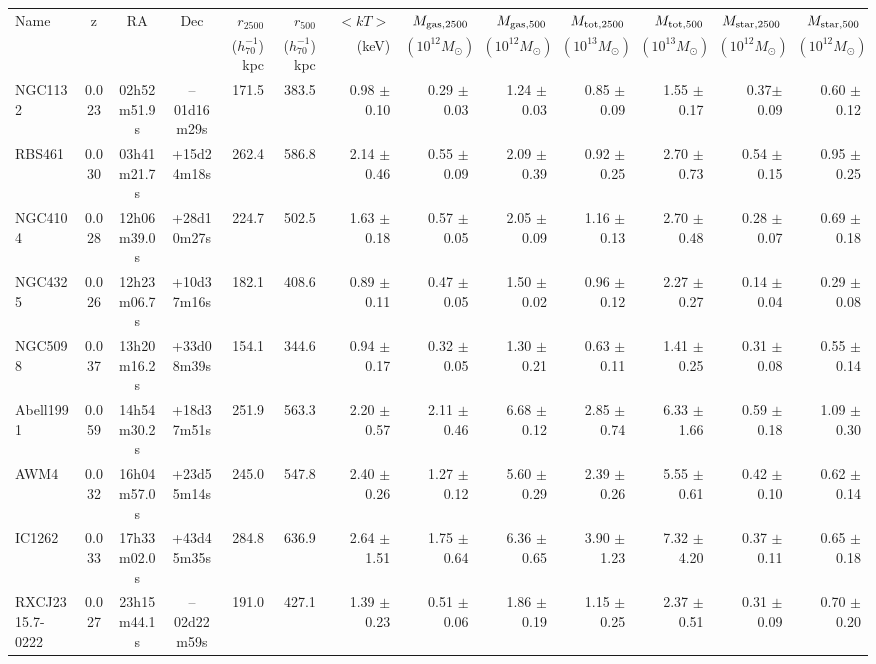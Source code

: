 \begin{tabular}{lcccrrrrrrrrr}
    Name & z & RA & Dec &$r_{2500}$ &$r_{500}$& $ <kT> $ & $M_{\rm gas,2500} $ &  $M_{\rm gas,500} $ &  $M_{\rm tot,2500} $ &  $M_{\rm tot,500} $ &    $M_{\rm star,2500} $ &  $M_{\rm star,500} $\\
     & & & & ($h_{70}^{-1}$) kpc & ($h_{70}^{-1}$) kpc &(keV) & $(10^{12} M_{\odot})$ & $(10^{12} M_{\odot})$ & $(10^{13} M_{\odot})$ & $(10^{13} M_{\odot})$ & $(10^{12} M_{\odot})$ & $(10^{12} M_{\odot})$\\
     \hline 
    NGC1132   	& 0.023 & 02h52m51.9s & --01d16m29s& 171.5 &383.5 & 0.98 $\pm$ 0.10 & 0.29 $\pm$ 0.03 &1.24 $\pm$ 0.03& 0.85 $\pm$ 0.09 &1.55 $\pm$ 0.17&  0.37$\pm$  0.09& 0.60 $\pm$ 0.12 \\
    RBS461    	& 0.030 & 03h41m21.7s & +15d24m18s& 262.4 &586.8 & 2.14 $\pm$ 0.46 & 0.55 $\pm$ 0.09 &2.09 $\pm$ 0.39& 0.92 $\pm$ 0.25 &2.70 $\pm$ 0.73&  0.54  $\pm$  0.15 & 0.95 $\pm$ 0.25 \\
    NGC4104   	& 0.028 & 12h06m39.0s & +28d10m27s& 224.7 &502.5 & 1.63 $\pm$ 0.18 & 0.57 $\pm$ 0.05 &2.05 $\pm$ 0.09& 1.16 $\pm$ 0.13 &2.70 $\pm$ 0.48&  0.28 $\pm$  0.07 & 0.69 $\pm$0.18  \\
    NGC4325   	& 0.026 & 12h23m06.7s & +10d37m16s& 182.1 &408.6 & 0.89 $\pm$ 0.11 & 0.47 $\pm$ 0.05 &1.50 $\pm$ 0.02& 0.96 $\pm$ 0.12 &2.27 $\pm$ 0.27&  0.14 $\pm$  0.04 & 0.29 $\pm$ 0.08 \\
    NGC5098   	& 0.037 & 13h20m16.2s & +33d08m39s& 154.1 &344.6 & 0.94 $\pm$ 0.17 & 0.32 $\pm$ 0.05 &1.30 $\pm$ 0.21& 0.63 $\pm$ 0.11 &1.41 $\pm$ 0.25&  0.31 $\pm$  0.08 & 0.55 $\pm$ 0.14 \\
    Abell1991		& 0.059 & 14h54m30.2s & +18d37m51s& 251.9 &563.3 & 2.20 $\pm$ 0.57 & 2.11 $\pm$ 0.46 &6.68 $\pm$ 0.12& 2.85 $\pm$ 0.74 &6.33 $\pm$ 1.66&  0.59 $\pm$  0.18 & 1.09 $\pm$ 0.30 \\
    AWM4 	  	& 0.032 & 16h04m57.0s & +23d55m14s& 245.0 &547.8 & 2.40 $\pm$ 0.26 & 1.27 $\pm$ 0.12 &5.60 $\pm$ 0.29& 2.39 $\pm$ 0.26 &5.55 $\pm$ 0.61&  0.42 $\pm$  0.10 & 0.62 $\pm$ 0.14 \\
    IC1262 	  	& 0.033 & 17h33m02.0s & +43d45m35s& 284.8 &636.9 & 2.64 $\pm$ 1.51 & 1.75 $\pm$ 0.64 &6.36 $\pm$ 0.65& 3.90 $\pm$ 1.23 &7.32 $\pm$ 4.20&  0.37 $\pm$  0.11 & 0.65 $\pm$ 0.18 \\
    RXCJ2315.7-0222 & 0.027 & 23h15m44.1s & --02d22m59s& 191.0 &427.1 & 1.39 $\pm$ 0.23 & 0.51 $\pm$ 0.06 &1.86 $\pm$ 0.19& 1.15 $\pm$ 0.25 &2.37 $\pm$ 0.51&  0.31 $\pm$ 0.09 & 0.70 $\pm$ 0.20\\
\end{tabular}